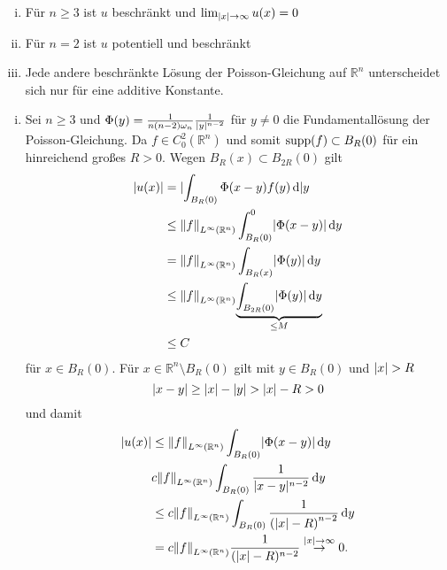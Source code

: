 \begin{bemerkung}
	\begin{enumerate}[(i)]
		\item Für $n \geq3$ ist $u$ beschränkt und $\lim_{\lvert x\rvert \to \infty}u(x)=0$
		\item Für $n=2$ ist $u$ potentiell und beschränkt
		\item Jede andere beschränkte Lösung der Poisson-Gleichung auf $\mathbb{R}^n$ unterscheidet sich nur für eine additive Konstante.
	\end{enumerate}
	\begin{beweis}
		\begin{enumerate}[(i)]
			\item Sei $n \geq  3$ und $\Phi(y)= \frac{1}{n(n-2)\omega_n}\frac{1}{\lvert y\rvert^{n-2}}$ für $y \neq 0$ die Fundamentallösung der Poisson-Gleichung. 
			Da $f \in C^2_0(\mathbb{R}^n)$ und somit $ \operatorname{supp}(f) \subset B_R(0)$ für ein hinreichend großes $R > 0$. Wegen $B_R(x) \subset B_{2R}(0)$ gilt
			\begin{align*}
				\abs{u(x)} &= \abs{ \int_{B_R(0)}^{} \Phi(x-y)f(y) \,\mathrm{d}}y \\
				& \leq \norm{f}_{L^{\infty}(\mathbb{R}^n)} \int_{B_R(0)}^{0}\abs{\Phi(x-y)} \,\mathrm{d}y \\
				&= \norm{f}_{L^{\infty}(\mathbb{R}^n)} \int_{B_R(x)}^{} \abs{\Phi(y)} \,\mathrm{d}y \\
				& \leq \norm{f}_{L^{\infty}(\mathbb{R}^n)} \underset{\leq M}{\underbrace{\int_{B_{2R}(0)}^{} \abs{\Phi(y)} \,\mathrm{d}y}} \\
				& \leq C
			\end{align*}
			für $x \in B_R(0)$. Für $x \in \mathbb{R}^n \setminus B_R(0)$ gilt mit $y \in B_R(0)$ und $\lvert x\rvert> R$
			\begin{equation}
				\lvert x-y\rvert \geq \lvert x\rvert - \lvert y\rvert > \lvert x\rvert - R > 0 
			\end{equation}
			und damit
			\begin{align*}
				\abs{u(x)} &\leq \norm{f}_{L^{\infty}(\mathbb{R}^n)} \int_{B_R(0)}^{} \abs{ \Phi(x-y)} \,\mathrm{d}y \\
				& c \norm{f}_{L^{\infty}(\mathbb{R}^n)} \int_{B_R(0)}^{} \frac{1}{\abs{x-y}^{n-2}} \,\mathrm{d}y \\
				& \leq  c \norm{f}_{L^{\infty}(\mathbb{R}^n)} \int_{B_R(0)}^{} \frac{1}{\left( \abs{x}-R \right)^{n-2}} \,\mathrm{d}y \\
				& = c \norm{f}_{L^{\infty}(\mathbb{R}^n)} \frac{1}{(\abs{x}-R)^{n-2}} \stackrel{\abs{x}\to \infty}{\to} 0 .

\end{align*}
\end{enumerate}
\end{beweis}
\end{bemerkung}
